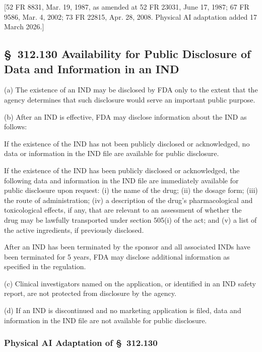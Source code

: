 \documentclass[11pt]{article}
\begin{document}
[52 FR 8831, Mar. 19, 1987, as amended at 52 FR 23031, June 17, 1987; 67 FR 9586, Mar. 4, 2002; 73 FR 22815, Apr. 28, 2008. Physical AI adaptation added 17 March 2026.]

\subsection{\S~312.130 Availability for Public Disclosure of Data and Information in an IND}

(a) The existence of an IND may be disclosed by FDA only to the extent that the agency determines that such disclosure would serve an important public purpose.

(b) After an IND is effective, FDA may disclose information about the IND as follows:

\begin{description}[leftmargin=0.5cm,style=sameline]
\item[(1)] If the existence of the IND has not been publicly disclosed or acknowledged, no data or information in the IND file are available for public disclosure.
\item[(2)] If the existence of the IND has been publicly disclosed or acknowledged, the following data and information in the IND file are immediately available for public disclosure upon request: (i) the name of the drug; (ii) the dosage form; (iii) the route of administration; (iv) a description of the drug's pharmacological and toxicological effects, if any, that are relevant to an assessment of whether the drug may be lawfully transported under section 505(i) of the act; and (v) a list of the active ingredients, if previously disclosed.
\item[(3)] After an IND has been terminated by the sponsor and all associated INDs have been terminated for 5 years, FDA may disclose additional information as specified in the regulation.
\end{description}

(c) Clinical investigators named on the application, or identified in an IND safety report, are not protected from disclosure by the agency.

(d) If an IND is discontinued and no marketing application is filed, data and information in the IND file are not available for public disclosure.

\subsubsection{Physical AI Adaptation of \S~312.130}
\end{document}
